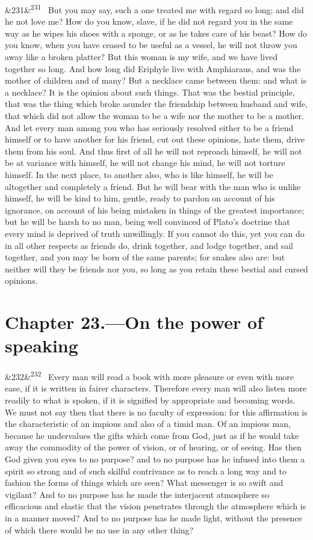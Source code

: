 \documentclass[12pt]{article}
\newcommand{\para}[1][]{\par\noindent\ifx&#1&\else\textsuperscript{\footnotesize #1}~\fi}
\begin{document}
\para[231] But you may say, such a one treated me with regard so long; and did he not love me? How do you know, slave, if he did not regard you in the same way as he wipes his shoes with a sponge, or as he takes care of his beast? How do you know, when you have ceased to be useful as a vessel, he will not throw you away like a broken platter? But this woman is my wife, and we have lived together so long. And how long did Eriphyle live with Amphiaraus, and was the mother of children and of many? But a necklace came between them: and what is a necklace? It is the opinion about such things. That was the bestial principle, that was the thing which broke asunder the friendship between husband and wife, that which did not allow the woman to be a wife nor the mother to be a mother. And let every man among you who has seriously resolved either to be a friend himself or to have another for his friend, cut out these opinions, hate them, drive them from his soul. And thus first of all he will not reproach himself, he will not be at variance with himself, he will not change his mind, he will not torture himself. In the next place, to another also, who is like himself, he will be altogether and completely a friend. But he will bear with the man who is unlike himself, he will be kind to him, gentle, ready to pardon on account of his ignorance, on account of his being mistaken in things of the greatest importance; but he will be harsh to no man, being well convinced of Plato's doctrine that every mind is deprived of truth unwillingly. If you cannot do this, yet you can do in all other respects as friends do, drink together, and lodge together, and sail together, and you may be born of the same parents; for snakes also are: but neither will they be friends nor you, so long as you retain these bestial and cursed opinions.

\section*{Chapter 23.---On the power of speaking}

\para[232] Every man will read a book with more pleasure or even with more ease, if it is written in fairer characters. Therefore every man will also listen more readily to what is spoken, if it is signified by appropriate and becoming words. We must not say then that there is no faculty of expression: for this affirmation is the characteristic of an impious and also of a timid man. Of an impious man, because he undervalues the gifts which come from God, just as if he would take away the commodity of the power of vision, or of hearing, or of seeing. Has then God given you eyes to no purpose? and to no purpose has he infused into them a spirit so strong and of such skilful contrivance as to reach a long way and to fashion the forms of things which are seen? What messenger is so swift and vigilant? And to no purpose has he made the interjacent atmosphere so efficacious and elastic that the vision penetrates through the atmosphere which is in a manner moved? And to no purpose has he made light, without the presence of which there would be no use in any other thing?
\end{document}
